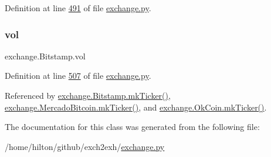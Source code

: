 Definition at line \hyperlink{exchange_8py_source_l00491}{491} of file \hyperlink{exchange_8py_source}{exchange.\+py}.

\mbox{\label{classexchange_1_1_bitstamp_a4ddf3680f552a7d634b3bbea809cc606}} 
\subsubsection{\texorpdfstring{vol}{vol}}
{\footnotesize\ttfamily exchange.\+Bitstamp.\+vol}



Definition at line \hyperlink{exchange_8py_source_l00507}{507} of file \hyperlink{exchange_8py_source}{exchange.\+py}.



Referenced by \hyperlink{exchange_8py_source_l00525}{exchange.\+Bitstamp.\+mk\+Ticker()}, \hyperlink{exchange_8py_source_l00665}{exchange.\+Mercado\+Bitcoin.\+mk\+Ticker()}, and \hyperlink{exchange_8py_source_l00730}{exchange.\+Ok\+Coin.\+mk\+Ticker()}.



The documentation for this class was generated from the following file\+:\begin{DoxyCompactItemize}
\item 
/home/hilton/github/exch2exh/\hyperlink{exchange_8py}{exchange.\+py}\end{DoxyCompactItemize}
